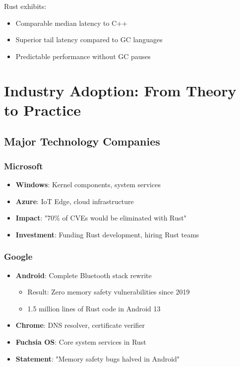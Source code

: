 \documentclass[11pt]{article}
\begin{document}
Rust exhibits:
\begin{itemize}
    \item Comparable median latency to C++
    \item Superior tail latency compared to GC languages
    \item Predictable performance without GC pauses
\end{itemize}

\section{Industry Adoption: From Theory to Practice}

\subsection{Major Technology Companies}

\subsubsection{Microsoft}
\begin{itemize}
    \item \textbf{Windows}: Kernel components, system services
    \item \textbf{Azure}: IoT Edge, cloud infrastructure
    \item \textbf{Impact}: "70\% of CVEs would be eliminated with Rust"~\cite{miller2019trends}
    \item \textbf{Investment}: Funding Rust development, hiring Rust teams
\end{itemize}

\subsubsection{Google}
\begin{itemize}
    \item \textbf{Android}: Complete Bluetooth stack rewrite
    \begin{itemize}
        \item Result: Zero memory safety vulnerabilities since 2019~\cite{google2022android}
        \item 1.5 million lines of Rust code in Android 13
    \end{itemize}
    \item \textbf{Chrome}: DNS resolver, certificate verifier
    \item \textbf{Fuchsia OS}: Core system services in Rust
    \item \textbf{Statement}: "Memory safety bugs halved in Android"~\cite{google2023memory}
\end{itemize}
\end{document}
